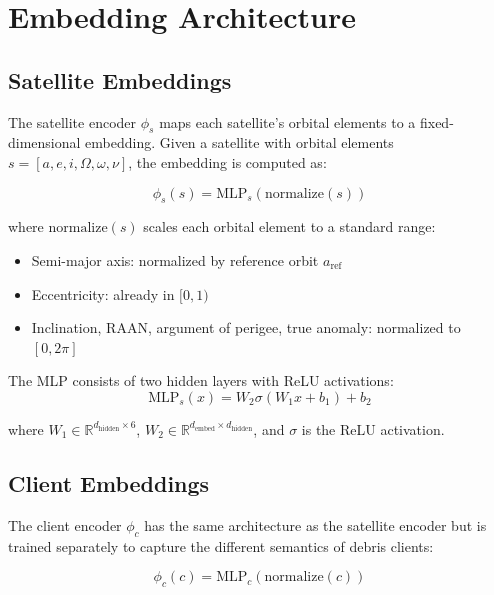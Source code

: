 \section{Embedding Architecture}
\label{sec:embeddings}

\subsection{Satellite Embeddings}

The satellite encoder $\phi_s$ maps each satellite's orbital elements to a fixed-dimensional embedding. Given a satellite with orbital elements $s = [a, e, i, \Omega, \omega, \nu]$, the embedding is computed as:

\begin{equation}
    \phi_s(s) = \text{MLP}_s\left(\text{normalize}(s)\right)
\end{equation}

where $\text{normalize}(s)$ scales each orbital element to a standard range:
\begin{itemize}
    \item Semi-major axis: normalized by reference orbit $a_{\text{ref}}$
    \item Eccentricity: already in $[0, 1)$
    \item Inclination, RAAN, argument of perigee, true anomaly: normalized to $[0, 2\pi]$
\end{itemize}

The MLP consists of two hidden layers with ReLU activations:
\begin{equation}
    \text{MLP}_s(x) = W_2 \sigma(W_1 x + b_1) + b_2
\end{equation}

where $W_1 \in \mathbb{R}^{d_{\text{hidden}} \times 6}$, $W_2 \in \mathbb{R}^{d_{\text{embed}} \times d_{\text{hidden}}}$, and $\sigma$ is the ReLU activation.

\subsection{Client Embeddings}

The client encoder $\phi_c$ has the same architecture as the satellite encoder but is trained separately to capture the different semantics of debris clients:

\begin{equation}
    \phi_c(c) = \text{MLP}_c\left(\text{normalize}(c)\right)
\end{equation}

